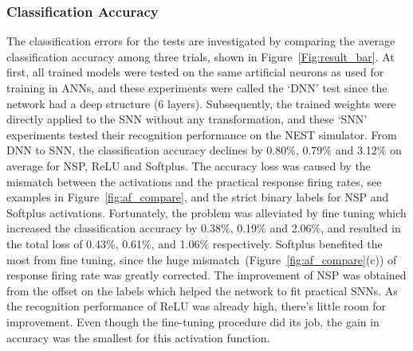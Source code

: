 	\subsubsection{Classification Accuracy}
	The classification errors for the tests are investigated by comparing the average classification accuracy among three trials, shown in Figure~\ref{Fig:result_bar}.
	At first, all trained models were tested on the same artificial neurons as used for training in ANNs, and these experiments were called the `DNN' test since the network had a deep structure (6 layers).
	Subsequently, the trained weights were directly applied to the SNN without any transformation, and these `SNN' experiments tested their recognition performance on the NEST simulator.
	From DNN to SNN, the classification accuracy declines by 0.80\%, 0.79\% and 3.12\% on average for NSP, ReLU and Softplus.
	The accuracy loss was caused by the mismatch between the activations and the practical response firing rates, see examples in Figure~\ref{fig:af_compare}, and the strict binary labels for NSP and Softplus activations.
	Fortunately, the problem was alleviated by fine tuning which increased the classification accuracy by 0.38\%, 0.19\% and 2.06\%, and resulted in the total loss of 0.43\%, 0.61\%, and 1.06\% respectively.
	Softplus benefited the most from fine tuning, since the huge mismatch~(Figure~\ref{fig:af_compare}(c)) of response firing rate was greatly corrected.
	The improvement of NSP was obtained from the offset on the labels which helped the network to fit practical SNNs.
	As the recognition performance of ReLU was already high, there's little room for improvement.
	Even though the fine-tuning procedure did its job, the gain in accuracy was the smallest for this activation function.
	
	
	
	
